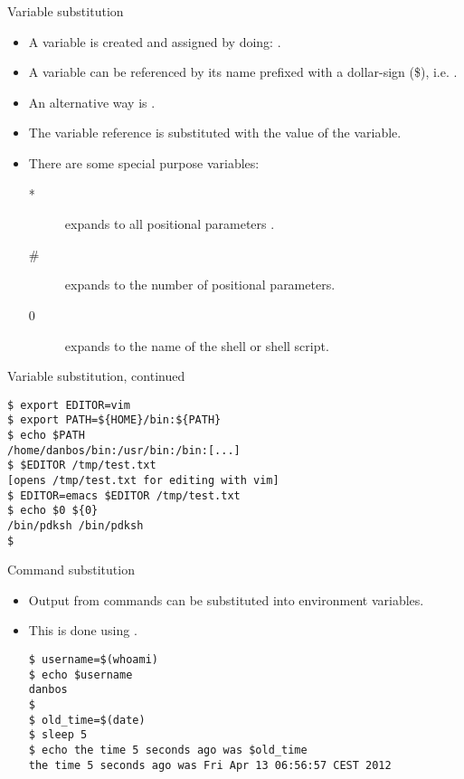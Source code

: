 \documentclass[handout]{beamer}
\begin{document}
\begin{frame}{Variable substitution}
	\begin{itemize}
		\item<1-3> A variable is created and assigned by doing: 
			.
		\item<2-3> A variable can be referenced by its name prefixed with 
			a dollar-sign (\$), i.e. .
		\item<2-3> An alternative way is .
		\item<3> The variable reference is substituted with the value of the 
			variable.
		\item<4> There are some special purpose variables:
			\begin{description}
				\item[*] expands to all positional parameters .
				\item[\#] expands to the number of positional parameters.
				\item[0] expands to the name of the shell or shell script.
			\end{description}
	\end{itemize}
\end{frame}
\begin{frame}[fragile]{Variable substitution, continued}
	\begin{lstlisting}
$ export EDITOR=vim
$ export PATH=${HOME}/bin:${PATH}
$ echo $PATH
/home/danbos/bin:/usr/bin:/bin:[...]
$ $EDITOR /tmp/test.txt
[opens /tmp/test.txt for editing with vim]
$ EDITOR=emacs $EDITOR /tmp/test.txt
$ echo $0 ${0}
/bin/pdksh /bin/pdksh
$
	\end{lstlisting}
\end{frame}
\begin{frame}[fragile]{Command substitution}
	\begin{itemize}
		\item<1-2> Output from commands can be substituted into environment 
			variables.
		\item<2> This is done using .
			\begin{lstlisting}
$ username=$(whoami)
$ echo $username
danbos
$
$ old_time=$(date)
$ sleep 5
$ echo the time 5 seconds ago was $old_time
the time 5 seconds ago was Fri Apr 13 06:56:57 CEST 2012
			\end{lstlisting}
	\end{itemize}
\end{frame}
\end{document}
